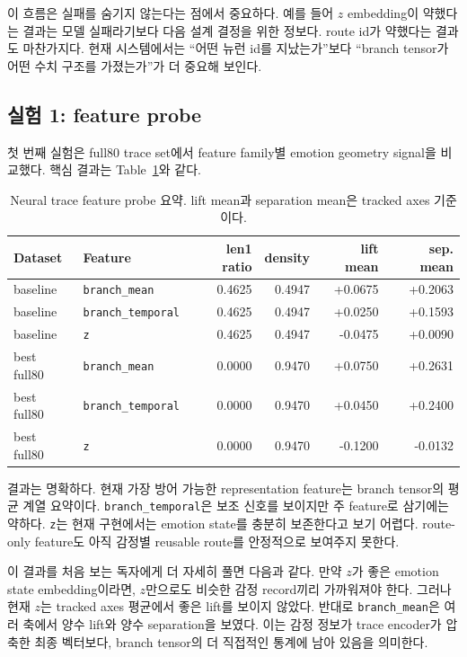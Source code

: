 \documentclass[11pt,a4paper]{article}
\begin{document}
이 흐름은 실패를 숨기지 않는다는 점에서 중요하다. 예를 들어 \(z\) embedding이 약했다는 결과는 모델 실패라기보다 다음 설계 결정을 위한 정보다. route id가 약했다는 결과도 마찬가지다. 현재 시스템에서는 ``어떤 뉴런 id를 지났는가''보다 ``branch tensor가 어떤 수치 구조를 가졌는가''가 더 중요해 보인다.

\subsection{실험 1: feature probe}

첫 번째 실험은 full80 trace set에서 feature family별 emotion geometry signal을 비교했다. 핵심 결과는 Table~\ref{tab:feature-probe}와 같다.

\begin{table}[h]
\centering
\begin{tabular}{llrrrr}
\toprule
Dataset & Feature & len1 ratio & density & lift mean & sep. mean \\
\midrule
baseline & \texttt{branch\_mean} & 0.4625 & 0.4947 & +0.0675 & +0.2063 \\
baseline & \texttt{branch\_temporal} & 0.4625 & 0.4947 & +0.0250 & +0.1593 \\
baseline & \texttt{z} & 0.4625 & 0.4947 & -0.0475 & +0.0090 \\
best full80 & \texttt{branch\_mean} & 0.0000 & 0.9470 & +0.0750 & +0.2631 \\
best full80 & \texttt{branch\_temporal} & 0.0000 & 0.9470 & +0.0450 & +0.2400 \\
best full80 & \texttt{z} & 0.0000 & 0.9470 & -0.1200 & -0.0132 \\
\bottomrule
\end{tabular}
\caption{Neural trace feature probe 요약. lift mean과 separation mean은 tracked axes 기준이다.}
\label{tab:feature-probe}
\end{table}

결과는 명확하다. 현재 가장 방어 가능한 representation feature는 branch tensor의 평균 계열 요약이다. \texttt{branch\_temporal}은 보조 신호를 보이지만 주 feature로 삼기에는 약하다. \texttt{z}는 현재 구현에서는 emotion state를 충분히 보존한다고 보기 어렵다. route-only feature도 아직 감정별 reusable route를 안정적으로 보여주지 못한다.

이 결과를 처음 보는 독자에게 더 자세히 풀면 다음과 같다. 만약 \(z\)가 좋은 emotion state embedding이라면, \(z\)만으로도 비슷한 감정 record끼리 가까워져야 한다. 그러나 현재 \(z\)는 tracked axes 평균에서 좋은 lift를 보이지 않았다. 반대로 \texttt{branch\_mean}은 여러 축에서 양수 lift와 양수 separation을 보였다. 이는 감정 정보가 trace encoder가 압축한 최종 벡터보다, branch tensor의 더 직접적인 통계에 남아 있음을 의미한다.
\end{document}

